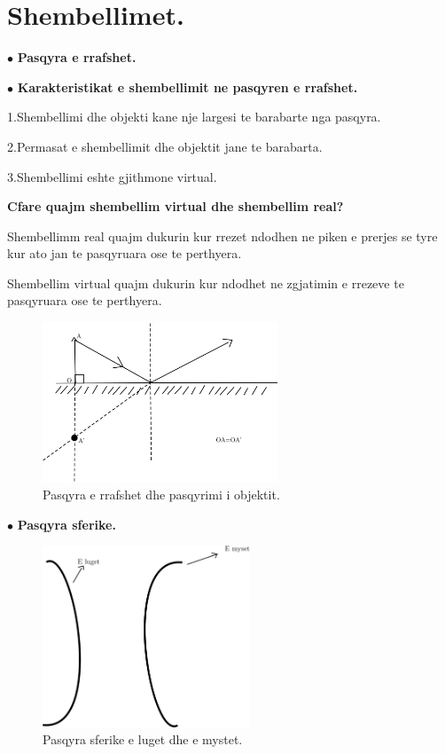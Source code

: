 \documentclass[twocolumn]{article}
\begin{document}
\section{Shembellimet.}

\begin{center}
$\bullet$	\textbf{Pasqyra e rrafshet.}
\end{center}
$\bullet$ \textbf{Karakteristikat e shembellimit ne pasqyren e rrafshet.}

1.Shembellimi dhe objekti kane nje largesi te barabarte nga pasqyra.

2.Permasat e shembellimit dhe objektit jane te barabarta.

3.Shembellimi eshte gjithmone virtual.

\textbf{Cfare quajm shembellim virtual dhe shembellim real?}

Shembellimm real quajm dukurin kur rrezet ndodhen ne piken e prerjes se tyre kur ato jan te pasqyruara ose te perthyera.

Shembellim virtual quajm dukurin kur ndodhet ne zgjatimin e rrezeve te pasqyruara ose te perthyera.

\begin{figure}[h]
	\includegraphics[width=70mm]{Imazhet/pasqyra e rrafshet.png}
	\caption{Pasqyra e rrafshet dhe pasqyrimi i objektit.}
	\label{fig:boat1}
\end{figure}

\begin{center}
$\bullet$	\textbf{Pasqyra sferike.}
\end{center}


\begin{figure}[h]
	\includegraphics[width=62mm]{Imazhet/pasqyra sferike e luget dhe myset.png}
	\caption{Pasqyra sferike e luget dhe e mystet.}
	\label{fig:boat1}
	\end{figure}
\end{document}
